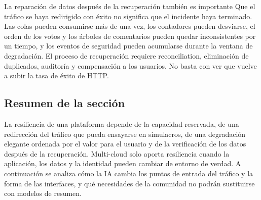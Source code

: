 \begin{warningbox}{La reparación de datos después de la recuperación también es importante}
Que el tráfico se haya redirigido con éxito no significa que el incidente haya terminado. Las colas pueden consumirse más de una vez, los contadores pueden desviarse, el orden de los votos y los árboles de comentarios pueden quedar inconsistentes por un tiempo, y los eventos de seguridad pueden acumularse durante la ventana de degradación. El proceso de recuperación requiere reconciliation, eliminación de duplicados, auditoría y compensación a los usuarios. No basta con ver que vuelve a subir la tasa de éxito de HTTP.
\end{warningbox}

\subsection{Resumen de la sección}

La resiliencia de una plataforma depende de la capacidad reservada, de una redirección del tráfico que pueda ensayarse en simulacros, de una degradación elegante ordenada por el valor para el usuario y de la verificación de los datos después de la recuperación. Multi-cloud solo aporta resiliencia cuando la aplicación, los datos y la identidad pueden cambiar de entorno de verdad. A continuación se analiza cómo la IA cambia los puntos de entrada del tráfico y la forma de las interfaces, y qué necesidades de la comunidad no podrán sustituirse con modelos de resumen.
